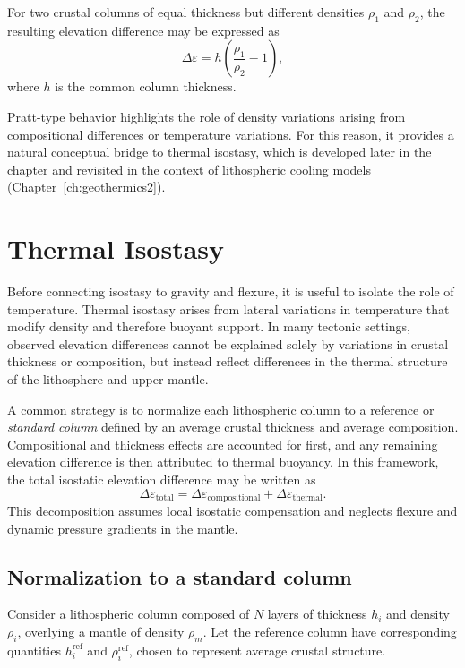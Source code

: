 For two crustal columns of equal thickness but different densities $\rho_1$ and $\rho_2$, the resulting elevation difference may be expressed as
\[
    \Delta \varepsilon = h \left(\frac{\rho_1}{\rho_2} - 1\right),
\]
where $h$ is the common column thickness.

Pratt-type behavior highlights the role of density variations arising from compositional differences or temperature variations.  For this reason, it provides a natural conceptual bridge to thermal isostasy, which is developed later in the chapter and revisited in the context of lithospheric cooling models (Chapter~\ref{ch:geothermics2}).

\section{Thermal Isostasy}\label{sec:thermal_isostasy}

Before connecting isostasy to gravity and flexure, it is useful to isolate the role of temperature.  Thermal isostasy arises from lateral variations in temperature that modify density and therefore buoyant support. In many tectonic settings, observed elevation differences cannot be explained solely by variations in crustal thickness or composition, but instead reflect differences in the thermal structure of the lithosphere and upper mantle.

A common strategy is to normalize each lithospheric column to a reference or \emph{standard column} defined by an average crustal thickness and average composition. Compositional and thickness effects are accounted for first, and any remaining elevation difference is then attributed to thermal buoyancy. In this framework, the total isostatic elevation difference may be written as
\begin{equation}
    \Delta \varepsilon_{\mathrm{total}}
    =
    \Delta \varepsilon_{\mathrm{compositional}}
    +
    \Delta \varepsilon_{\mathrm{thermal}} .
\end{equation}
This decomposition assumes local isostatic compensation and neglects flexure and dynamic pressure gradients in the mantle.

\subsection{Normalization to a standard column}

Consider a lithospheric column composed of \(N\) layers of thickness \(h_i\) and density \(\rho_i\), overlying a mantle of density \(\rho_m\). Let the reference column have corresponding quantities \(h_i^{\mathrm{ref}}\) and \(\rho_i^{\mathrm{ref}}\), chosen to represent average crustal structure.

